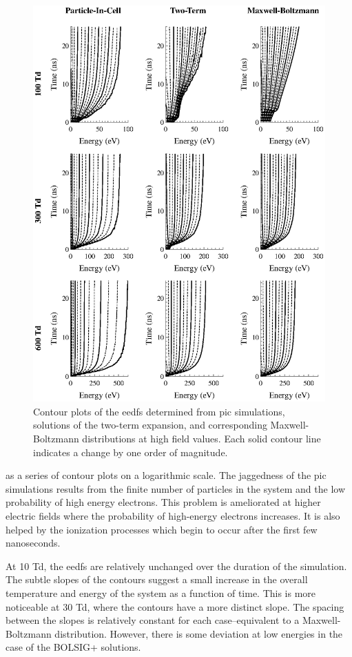 \begin{figure}
  \centering
  \includegraphics{./chapters/modeling/figures/picmb2.eps}
  \caption{Contour plots of the \acs{eedf}s determined from \acs{pic}
    simulations, solutions of the two-term expansion, and corresponding
    Maxwell-Boltzmann distributions at high field values. Each solid contour
    line indicates a change by one order of magnitude.}
  \label{fig:picmb2}
\end{figure}
as a series of contour plots on a logarithmic scale. The jaggedness of the
\acs{pic} simulations results from the finite number of particles in the system
and the low probability of high energy electrons. This problem is ameliorated at
higher electric fields where the probability of high-energy electrons increases.
It is also helped by the ionization processes which begin to occur after the
first few nanoseconds.

At 10 Td, the \acs{eedf}s are relatively unchanged over the duration of the
simulation. The subtle slopes of the contours suggest a small increase in the
overall temperature and energy of the system as a function of time. This is more
noticeable at 30 Td, where the contours have a more distinct slope. The spacing
between the slopes is relatively constant for each case--equivalent to a
Maxwell-Boltzmann distribution. However, there is some deviation at low energies
in the case of the BOLSIG+ solutions.

